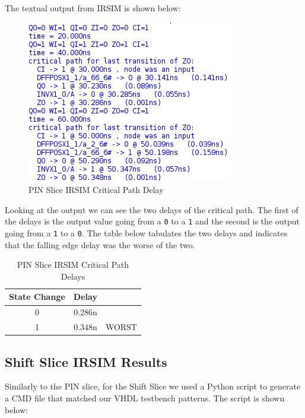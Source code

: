         The textual output from IRSIM is shown below:

        \begin{figure}[H]
            \centering
            \includegraphics[width=0.5\linewidth]{../../irsim/pin_slice_timing.png}
            \caption{PIN Slice IRSIM Critical Path Delay}
        \end{figure}
        \vspace{\baselineskip}

        Looking at the output we can see the two delays of the critical path.
        The first of the delays is the output value going from a \texttt{0} to
        a \texttt{1} and the second is the output going from a \texttt{1} to a
        \texttt{0}.  The table below tabulates the two delays and indicates
        that the falling edge delay was the worse of the two.
        \vspace{\baselineskip}

        \begin{table}[H]
            \centering
            \begin{tabular}{crc}
                \toprule
                \textbf{State Change} & \textbf{Delay} & \\
                \midrule
                0 & 0.286n & \\
                1 & 0.348n & WORST \\
                \bottomrule
            \end{tabular}
            \caption{PIN Slice IRSIM Critical Path Delays}
        \end{table}

    \newpage
    \subsection{Shift Slice IRSIM Results}

        Similarly to the PIN slice, for the Shift Slice we used a Python script
        to generate a CMD file that matched our VHDL testbench patterns. The
        script is shown below:


